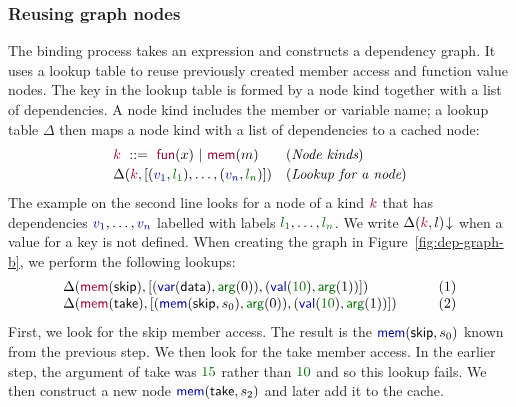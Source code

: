 \documentclass[english,crc]{programming}
\theoremstyle{plain}
\theoremstyle{definition}
\newcommand{\num}[1]{\textcolor{numclr}{#1}}
\newcommand{\ident}[1]{\textnormal{\textcolor{idclr}{\sffamily #1}}}
\newcommand{\bndclr}[1]{\textcolor{kvdclr}{#1}}
\newcommand{\bkndclr}[1]{\textcolor{prepclr}{#1}}
\newcommand{\blblclr}[1]{\textcolor{numclr}{#1}}
\newcommand{\bnd}[1]{\textnormal{\textcolor{kvdclr}{\sffamily #1}}}
\newcommand{\bknd}[1]{\textnormal{\textcolor{prepclr}{\sffamily #1}}}
\newcommand{\blbl}[1]{\textnormal{\textcolor{numclr}{\sffamily #1}}}
\begin{document}
\subsubsection{Reusing graph nodes}
The binding process takes an expression and constructs a dependency graph.
It uses a lookup table to reuse previously created member access and function value nodes. The key
in the lookup table is formed by a node kind together with a list of dependencies. A node kind
includes the member or variable name; a lookup table $\Delta$ then maps a node kind with a list
of dependencies to a cached node:
%
\begin{equation*}
\begin{array}{ll}
\bkndclr{k}~::=~\bknd{fun}(x)~|~\bknd{mem}(m)&(\textit{Node kinds})\\[0.2em]
\Delta(\bkndclr{k}, [(\bndclr{v_1},\blblclr{l_1}), \ldots, (\bndclr{v_n},\blblclr{l_n})])  & (\textit{Lookup for a node})
\end{array}
\end{equation*}
%
The example on the second line looks for a node of a kind $\bkndclr{k}$ that has dependencies
$\bndclr{v_1}, \ldots, \bndclr{v_n}$ labelled with labels $\blblclr{l_1}, \ldots, \blblclr{l_n}$.
We write $\Delta(\bkndclr{k}, l)\!\downarrow$ when a value for a key is not defined.
When creating the graph in Figure~\ref{fig:dep-graph-b},
we perform the following lookups:
%
\begin{equation*}
\begin{array}{ll}
\Delta(\bknd{mem}(\ident{skip}), [(\bnd{var}(\ident{data}),\blbl{arg}(0)), (\bnd{val}(\num{10}), \blbl{arg}(1))]) &\qquad(1)\\
\Delta(\bknd{mem}(\ident{take}), [(\bnd{mem}(\ident{skip}, s_0),\blbl{arg}(0)), (\bnd{val}(\num{10}), \blbl{arg}(1))]) &\qquad(2)
\end{array}
\end{equation*}
%
First, we look for the \ident{skip} member access. The result is the $\bnd{mem}(\ident{skip}, s_0)$
known from the previous step. We then look for the \ident{take} member access. In the earlier
step, the argument of \ident{take} was $\num{15}$ rather than $\num{10}$ and so this lookup fails.
We then construct a new node $\bnd{mem}(\ident{take}, s_2)$ and later add it to the cache.

\end{document}
